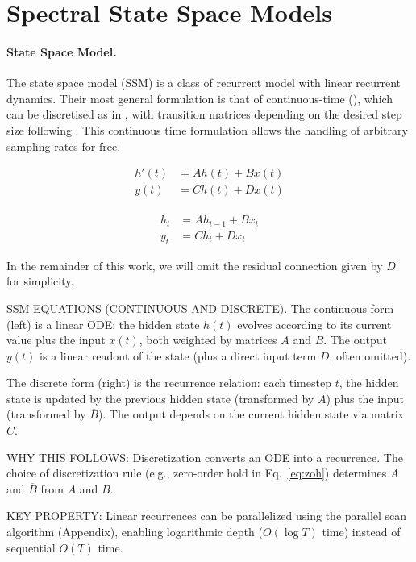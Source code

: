 \documentclass{article}
\begin{document}
\section{Spectral State Space Models}

\paragraph{State Space Model.} The state space model (SSM) is a class of recurrent model with linear recurrent dynamics. Their most general formulation is that of continuous-time (), which can be discretised as in , with transition matrices depending on the desired step size following . This continuous time formulation allows the handling of arbitrary sampling rates for free.

\begin{minipage}[t]{.45\linewidth}
  \begin{subequations}
    \label{eq:ssm}
    \begin{align}
      h'(t) &= A h(t) + B x(t) \\
      y(t) &= C h(t) + D x(t)
    \end{align}
  \end{subequations}
\end{minipage}%
\begin{minipage}[t]{.45\linewidth}
  \begin{subequations}
    \label{eq:ssm:recurrence}
    \begin{align}
    \label{eq:ssm:recurrence:1}
      h_{t} &= \overline{A} h_{t-1} + \overline{B} x_t \\
    \label{eq:ssm:recurrence:2}
      y_t &= C h_t + D x_t
    \end{align}
  \end{subequations}
\end{minipage}%

In the remainder of this work, we will omit the residual connection given by $D$ for simplicity.

\begin{thomasbox}
SSM EQUATIONS (CONTINUOUS AND DISCRETE). The continuous form (left) is a linear ODE: the hidden state $h(t)$ evolves according to its current value plus the input $x(t)$, both weighted by matrices $A$ and $B$. The output $y(t)$ is a linear readout of the state (plus a direct input term $D$, often omitted).

The discrete form (right) is the recurrence relation: each timestep $t$, the hidden state is updated by the previous hidden state (transformed by $\overline{A}$) plus the input (transformed by $\overline{B}$). The output depends on the current hidden state via matrix $C$.

WHY THIS FOLLOWS: Discretization converts an ODE into a recurrence. The choice of discretization rule (e.g., zero-order hold in Eq.~\ref{eq:zoh}) determines $\overline{A}$ and $\overline{B}$ from $A$ and $B$.

KEY PROPERTY: Linear recurrences can be parallelized using the parallel scan algorithm (Appendix), enabling logarithmic depth ($O(\log T)$ time) instead of sequential $O(T)$ time.
\end{thomasbox}
\end{document}
